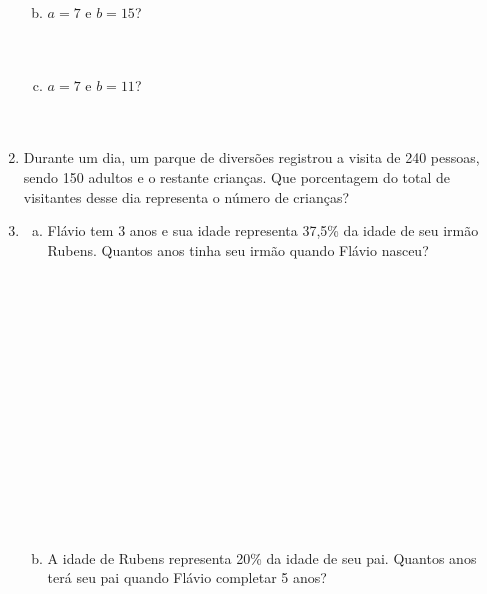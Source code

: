 \documentclass[a4paper,14pt]{article}
\begin{document}
\begin{multicols}{2}
\begin{enumerate}
\begin{enumerate}[a)]
				\\\\\\
				\item $a = 7$ e $b = 15$?
				\\\\\\
				\item $a = 7$ e $b = 11$?
				\\\\\\
			\end{enumerate}
			\item Durante um dia, um parque de diversões registrou a visita de 240 pessoas, sendo 150 adultos e o restante crianças. Que porcentagem do total de visitantes desse dia representa o número de crianças? \newpage
			\item \begin{enumerate}[a)]
				\item Flávio tem 3 anos e sua idade representa 37,5\% da idade de seu irmão Rubens. Quantos anos tinha seu irmão quando Flávio nasceu? \\\\\\\\\\\\\\\\\\\\\\\\\\\\\\
				\item A idade de Rubens representa 20\% da idade de seu pai. Quantos anos terá seu pai quando Flávio completar 5 anos? \\\\\\\\\\\\\\\\\\\\\\\\\\\\\\\\

\end{enumerate}
\end{enumerate}
\end{multicols}
\end{document}
